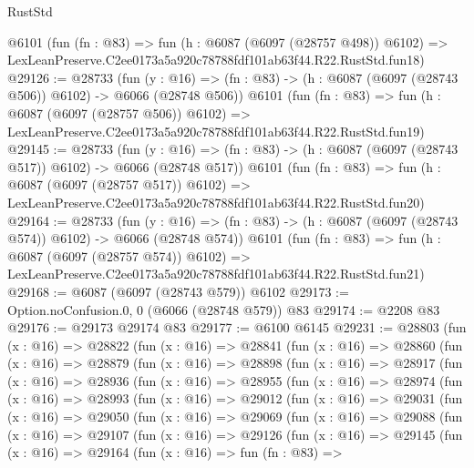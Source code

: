 \begin{lexlean}{RustStd}
\begin{coremodule}
    @6101
    (fun (fn : @83) =>
    fun (h : @6087 (@6097 (@28757 @498)) @6102) =>
    LexLeanPreserve.C2ee0173a5a920c78788fdf101ab63f44.R22.RustStd.fun18)
@29126 := @28733
    (fun (y : @16) => (fn : @83) -> (h : @6087 (@6097 (@28743 @506)) @6102) -> @6066 (@28748 @506))
    @6101
    (fun (fn : @83) =>
    fun (h : @6087 (@6097 (@28757 @506)) @6102) =>
    LexLeanPreserve.C2ee0173a5a920c78788fdf101ab63f44.R22.RustStd.fun19)
@29145 := @28733
    (fun (y : @16) => (fn : @83) -> (h : @6087 (@6097 (@28743 @517)) @6102) -> @6066 (@28748 @517))
    @6101
    (fun (fn : @83) =>
    fun (h : @6087 (@6097 (@28757 @517)) @6102) =>
    LexLeanPreserve.C2ee0173a5a920c78788fdf101ab63f44.R22.RustStd.fun20)
@29164 := @28733
    (fun (y : @16) => (fn : @83) -> (h : @6087 (@6097 (@28743 @574)) @6102) -> @6066 (@28748 @574))
    @6101
    (fun (fn : @83) =>
    fun (h : @6087 (@6097 (@28757 @574)) @6102) =>
    LexLeanPreserve.C2ee0173a5a920c78788fdf101ab63f44.R22.RustStd.fun21)
@29168 := @6087 (@6097 (@28743 @579)) @6102
@29173 := Option.noConfusion.{0, 0} (@6066 (@28748 @579)) @83
@29174 := @2208 @83
@29176 := @29173 @29174 @83
@29177 := @6100 @6145
@29231 := @28803
    (fun (x : @16) =>
    @28822
      (fun (x : @16) =>
      @28841
        (fun (x : @16) =>
        @28860
          (fun (x : @16) =>
          @28879
            (fun (x : @16) =>
            @28898
              (fun (x : @16) =>
              @28917
                (fun (x : @16) =>
                @28936
                  (fun (x : @16) =>
                  @28955
                    (fun (x : @16) =>
                    @28974
                      (fun (x : @16) =>
                      @28993
                        (fun (x : @16) =>
                        @29012
                          (fun (x : @16) =>
                          @29031
                            (fun (x : @16) =>
                            @29050
                              (fun (x : @16) =>
                              @29069
                                (fun (x : @16) =>
                                @29088
                                  (fun (x : @16) =>
                                  @29107
                                    (fun (x : @16) =>
                                    @29126
                                      (fun (x : @16) =>
                                      @29145
                                        (fun (x : @16) =>
                                        @29164
                                          (fun (x : @16) =>
                                          fun (fn : @83) =>

\end{coremodule}
\end{lexlean}

